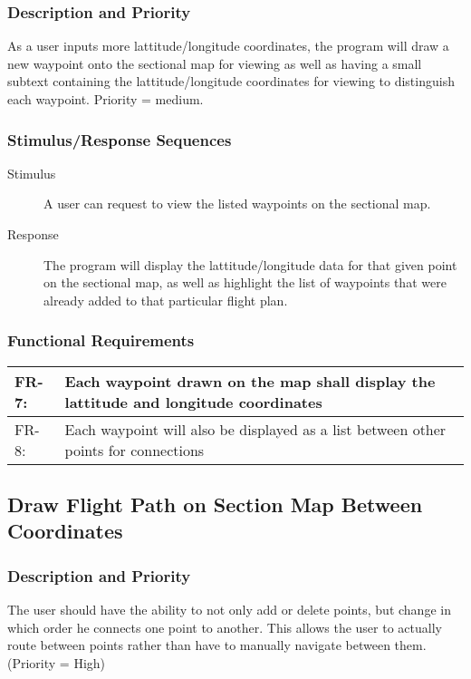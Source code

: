 \documentclass[12pt, letterpaper]{article}
\begin{document}
      \subsubsection{Description and Priority}
		As a user inputs more lattitude/longitude coordinates, the program will
	    draw a new waypoint onto the sectional map for viewing as well 
		as having a small subtext containing the lattitude/longitude coordinates 
		for viewing to distinguish each waypoint. Priority = medium.
      \subsubsection{Stimulus/Response Sequences}
        \begin{description}
          \item[Stimulus] A user can request to view the listed waypoints on the
			sectional map.
		  \item[Response] The program will display the lattitude/longitude data
			for that given point on the sectional map, as well as highlight the
			list of waypoints that were already added to that particular flight
			plan.
        \end{description}
      \subsubsection{Functional Requirements}
      \begin{tabularx}{\textwidth}{|l|X|} \hline
        FR-7: & Each waypoint drawn on the map shall display the lattitude and longitude coordinates\\ \hline
        FR-8: & Each waypoint will also be displayed as a list between other points for connections\\ \hline
        \end{tabularx}


      \subsection{Draw Flight Path on Section Map Between Coordinates}
        \subsubsection{Description and Priority}
        		The user should have the ability to not only add or delete points, but change in which
        		order he connects one point to another. This allows the user to actually route between 
        		points rather than have to manually navigate between them. (Priority = High)
\end{document}
